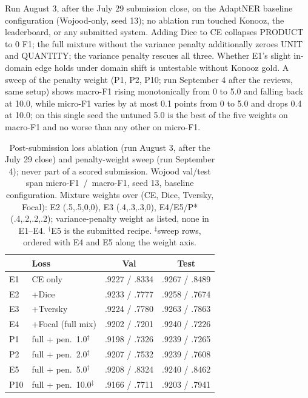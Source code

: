 \documentclass[11pt]{article}
\begin{document}
Run August 3, after the July 29 submission close, on the AdaptNER
baseline configuration (Wojood-only, seed 13); no ablation run touched
Konooz, the leaderboard, or any submitted system. Adding Dice to CE
collapses PRODUCT to 0 F1; the full mixture without the variance penalty
additionally zeroes UNIT and QUANTITY; the variance penalty rescues all
three. Whether E1's slight in-domain edge holds under domain shift is
untestable without Konooz gold. A sweep of the penalty weight (P1, P2,
P10; run September 4 after the reviews, same setup) shows macro-F1
rising monotonically from 0 to 5.0 and falling back at 10.0, while
micro-F1 varies by at most 0.1 points from 0 to 5.0 and drops 0.4 at
10.0; on this single seed the untuned 5.0 is the best of the five
weights on macro-F1 and no worse than any other on micro-F1.

\begin{table}[H]
\centering
\small
\setlength{\tabcolsep}{3pt}
\begin{tabular}{llcc}
\toprule
 & \textbf{Loss} & \textbf{Val} & \textbf{Test} \\
\midrule
E1 & CE only & .9227 / .8334 & .9267 / .8489 \\
E2 & +Dice & .9233 / .7777 & .9258 / .7674 \\
E3 & +Tversky & .9224 / .7780 & .9263 / .7863 \\
E4 & +Focal (full mix) & .9202 / .7201 & .9240 / .7226 \\
P1 & full + pen.\ 1.0$^{\ddagger}$ & .9198 / .7326 & .9239 / .7265 \\
P2 & full + pen.\ 2.0$^{\ddagger}$ & .9207 / .7532 & .9239 / .7608 \\
E5 & full + pen.\ 5.0$^{\dagger}$ & .9208 / .8324 & .9240 / .8462 \\
P10 & full + pen.\ 10.0$^{\ddagger}$ & .9166 / .7711 & .9203 / .7941 \\
\bottomrule
\end{tabular}
\caption{Post-submission loss ablation (run August 3, after the July 29
close) and penalty-weight sweep (run September 4); never part of a
scored submission. Wojood val/test span micro-F1~/~macro-F1, seed 13,
baseline configuration. Mixture weights over (CE, Dice, Tversky,
Focal): E2 (.5,.5,0,0), E3 (.4,.3,.3,0), E4/E5/P* (.4,.2,.2,.2);
variance-penalty weight as listed, none in E1--E4.
$^{\dagger}$E5 is the submitted recipe. $^{\ddagger}$sweep rows, ordered
with E4 and E5 along the weight axis.}
\label{tab:ablation}
\end{table}
\end{document}
